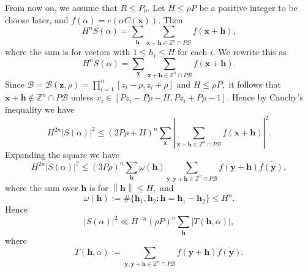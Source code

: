 \documentclass[12pt]{amsart}
\theoremstyle{definition}
\numberwithin{equation}{section}
\begin{document}
From now on, we assume that $R \leq P_{0}.$ Let $H \leq \rho P$ be a positive integer to be choose later, and $f(\alpha)=e(\alpha C(\boldsymbol{x})).$ Then
\begin{equation*}
    H^nS(\alpha)=\sum_{\boldsymbol{h}}\sum_{\boldsymbol{x}+\boldsymbol{h} \in \mathbb{Z}^{n}\cap P\mathscr{B}} f(\boldsymbol{x}+\boldsymbol{h}),
\end{equation*}
where the sum is for vectors with $1 \leq h_i \leq H$ for each $i$. We rewrite this as
\begin{equation*}
    H^nS(\alpha)=\sum_{\boldsymbol{x}}\sum_{\boldsymbol{x}+\boldsymbol{h} \in \mathbb{Z}^{n}\cap P\mathscr{B}} f(\boldsymbol{x}+\boldsymbol{h}).
\end{equation*}
Since $\mathscr{B}=\mathscr{B}(\boldsymbol{z},\rho) =\prod_{i=1}^{n}[z_i-\rho,z_i+\rho]$ and $H \leq \rho P,$ it follows that $\boldsymbol{x}+\boldsymbol{h} \notin \mathbb{Z}^{n}\cap P\mathscr{B}$ unless $x_i \in [Pz_i-P\rho-H,Pz_i+P\rho-1].$ Hence by Cauchy's inequality we have
\begin{equation}
    \label{from_Cauchy}
    H^{2n}\left|S(\alpha)\right|^2 \leq (2P\rho+H)^n\sum_{\boldsymbol{x}}\left| \sum_{\boldsymbol{x}+\boldsymbol{h} \in \mathbb{Z}^{n}\cap P\mathscr{B}} f(\boldsymbol{x}+\boldsymbol{h}) \right|^2.
\end{equation}
Expanding the square we have
\begin{equation}
    \label{3_3_2}
    H^{2n}\left|S(\alpha)\right|^2 \leq (3P\rho)^n\sum_{\boldsymbol{h}} \omega(\boldsymbol{h})\sum_{\boldsymbol{y},\boldsymbol{y}+\boldsymbol{h} \in \mathbb{Z}^{n}\cap P\mathscr{B}} f(\boldsymbol{y}+\boldsymbol{h})\overline{f(\boldsymbol{y})},
\end{equation}
where the sum over $\boldsymbol{h}$ is for $\left\|\boldsymbol{h}\right\| \leq H,$ and
\begin{equation}
    \label{omega}
    \omega(\boldsymbol{h}):=\#\{\boldsymbol{h}_1, \boldsymbol{h}_2 : \boldsymbol{h}=\boldsymbol{h}_1-\boldsymbol{h}_2\} \leq H^n.
\end{equation}
Hence
\begin{equation}
    \label{3_3_4}
    \left|S(\alpha)\right|^2 \ll H^{-n}(\rho P)^n\sum_{\boldsymbol{h}}|T(\boldsymbol{h},\alpha)|,
\end{equation}
where
\begin{equation}
    \label{T(h,alpha)_definition}
    T(\boldsymbol{h},\alpha):=\sum_{\boldsymbol{y},\boldsymbol{y}+\boldsymbol{h} \in \mathbb{Z}^{n}\cap P\mathscr{B}}f(\boldsymbol{y}+\boldsymbol{h})\overline{f(\boldsymbol{y})}.
\end{equation}
\end{document}
